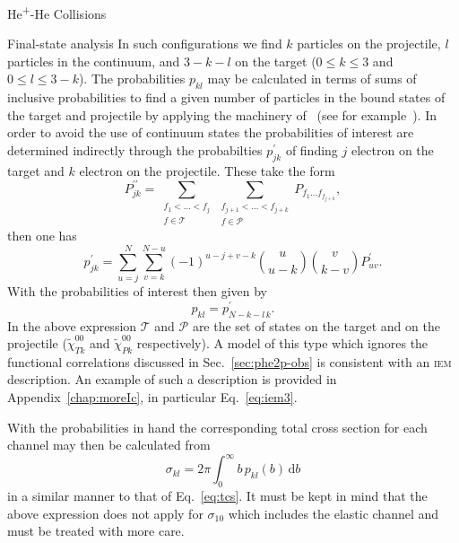 \documentclass[letterpaper, 11 pt]{report}
\begin{document}
\begin{chapter}{\texorpdfstring{He\textsuperscript{+}}{He+}-He Collisions \label{chap:hephe}}
\begin{section}{Final-state analysis \label{sec:hephe-det}}
      In such configurations we find $k$ particles on the projectile, $l$ particles in the continuum,
      and $3 - k - l$ on the target ($0\leq k \leq 3$ and $0 \leq l \leq 3 - k$). The probabilities
      $p_{kl}$ may be calculated in terms of sums of inclusive probabilities to find a given number of
      particles in the bound states of the target and projectile by applying the machinery
      of~\cite{inc-prob} (see for example~\cite{incEx, mitsuko12, gerald15}). In order to avoid the use
      of continuum states the probabilities of interest are determined indirectly through the
      probabilties $p^\prime_{jk}$ of finding $j$ electron on the target and $k$ electron on the
      projectile. These take the form
      \begin{equation} \label{eq:probGer1}
         P^{\prime\prime}_{jk} = \sum\limits_{\substack{f_1 < \dots < f_j \\ f \in \mathcal{T}}}
                         \sum\limits_{\substack{f_{j+1} < \dots < f_{j+k} \\ f \in \mathcal{P}}}
                         P_{f_1 \dots f_{f_{j+k}}},
      \end{equation}
      then one has
      \begin{equation} \label{eq:probGer2}
         p^\prime_{jk} = \sum\limits_{u = j}^N \sum\limits_{v = k}^{N-u} (-1)^{u - j + v -k}
                   {{u}\choose{u-k}} {{v}\choose{k - v}} P^\prime_{uv}.
      \end{equation}
      With the probabilities of interest then given by
      \begin{equation}
         p_{kl} = p^\prime_{N - k - l \, k}.
      \end{equation}
      In the above expression $\mathcal{T}$ and $\mathcal{P}$ are the set of states on the target
      and on the projectile ($\tilde{\chi}^{00}_{Tk}$ and $\tilde{\chi}^{00}_{Pk}$ respectively). A
      model of this type which ignores the functional correlations discussed in Sec.~\ref{sec:phe2p-obs}
      is consistent with an \textsc{iem} description. An example of such a description is provided in
      Appendix~\ref{chap:moreIc}, in particular Eq.~\eqref{eq:iem3}.

      With the probabilities in hand the corresponding total cross section for each channel may then be
      calculated from
      \begin{equation} \label{eq:cross}
         \sigma_{kl} = 2 \pi \int_0^\infty b \, p_{kl}(b) \, \mathrm{d}b
      \end{equation}
      in a similar manner to that of Eq.~\eqref{eq:tcs}. It must be kept in mind that the above
      expression does not apply for $\sigma_{10}$ which includes the elastic channel and must be
      treated with more care.


\end{section}
\end{chapter}
\end{document}
